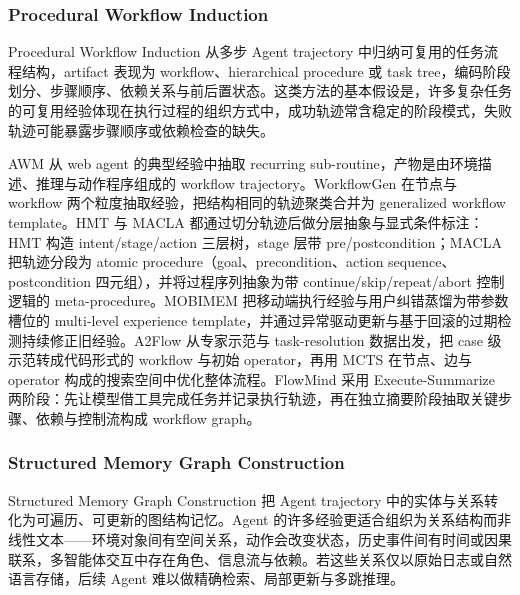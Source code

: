 \subsubsection{Procedural Workflow Induction}

Procedural Workflow Induction 从多步 Agent trajectory 中归纳可复用的任务流程结构，artifact 表现为 workflow、hierarchical procedure 或 task tree，编码阶段划分、步骤顺序、依赖关系与前后置状态。这类方法的基本假设是，许多复杂任务的可复用经验体现在执行过程的组织方式中，成功轨迹常含稳定的阶段模式，失败轨迹可能暴露步骤顺序或依赖检查的缺失。

AWM \cite{Wan24} 从 web agent 的典型经验中抽取 recurring sub-routine，产物是由环境描述、推理与动作程序组成的 workflow trajectory。WorkflowGen \cite{Wei26} 在节点与 workflow 两个粒度抽取经验，把结构相同的轨迹聚类合并为 generalized workflow template。HMT \cite{Tan26} 与 MACLA \cite{For25} 都通过切分轨迹后做分层抽象与显式条件标注：HMT 构造 intent/stage/action 三层树，stage 层带 pre/postcondition；MACLA 把轨迹分段为 atomic procedure（goal、precondition、action sequence、postcondition 四元组），并将过程序列抽象为带 continue/skip/repeat/abort 控制逻辑的 meta-procedure。MOBIMEM \cite{Liu25i} 把移动端执行经验与用户纠错蒸馏为带参数槽位的 multi-level experience template，并通过异常驱动更新与基于回滚的过期检测持续修正旧经验。A2Flow \cite{Zha25c} 从专家示范与 task-resolution 数据出发，把 case 级示范转成代码形式的 workflow 与初始 operator，再用 MCTS 在节点、边与 operator 构成的搜索空间中优化整体流程。FlowMind \cite{Liu26} 采用 Execute-Summarize 两阶段：先让模型借工具完成任务并记录执行轨迹，再在独立摘要阶段抽取关键步骤、依赖与控制流构成 workflow graph。

\subsubsection{Structured Memory Graph Construction}

Structured Memory Graph Construction 把 Agent trajectory 中的实体与关系转化为可遍历、可更新的图结构记忆。Agent 的许多经验更适合组织为关系结构而非线性文本——环境对象间有空间关系，动作会改变状态，历史事件间有时间或因果联系，多智能体交互中存在角色、信息流与依赖。若这些关系仅以原始日志或自然语言存储，后续 Agent 难以做精确检索、局部更新与多跳推理。

